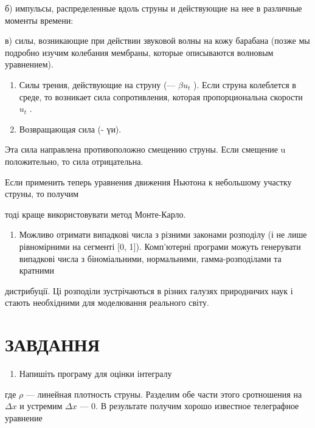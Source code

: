 \documentclass[
  ukrainian,
]{article}
\providecommand{\tightlist}{%
  \setlength{\itemsep}{0pt}\setlength{\parskip}{0pt}}
\begin{document}
б) импульсы, распределенные вдоль струны и действующие на нее в
различные моменты времени:

в) силы, возникающие при действии звуковой волны на кожу барабана (позже
мы подробно изучим колебания мембраны, которые описываются волновым
уравнением).

\begin{enumerate}
\def\labelenumi{\arabic{enumi}.}
\setcounter{enumi}{2}
\item
  Силы трения, действующие на струну (--- \(\beta u_t\) ). Если струна
  колеблется в среде, то возникает сила сопротивления, которая
  пропорциональна скорости \(u_t\) .
\item
  Возвращающая сила (- үи).
\end{enumerate}

Эта сила направлена противоположно смещению струны. Если смещение u
положительно, то сила отрицательна.

Если применить теперь уравнения движения Ньютона к небольшому участку
струны, то получим

тоді краще використовувати метод Монте-Карло.

\begin{enumerate}
\def\labelenumi{\arabic{enumi}.}
\setcounter{enumi}{2}
\tightlist
\item
  Можливо отримати випадкові числа з різними законами розподілу (і не
  лише рівномірними на сегменті {[}0, 1{]}). Комп'ютерні програми можуть
  генерувати випадкові числа з біноміальними, нормальними,
  гамма-розподілами та кратними
\end{enumerate}

дистрибуції. Ці розподіли зустрічаються в різних галузях природничих
наук і стають необхідними для моделювання реального світу.

\section{ЗАВДАННЯ}\label{ux437ux430ux432ux434ux430ux43dux43dux44f-9}

\begin{enumerate}
\def\labelenumi{\arabic{enumi}.}
\tightlist
\item
  Напишіть програму для оцінки інтегралу
\end{enumerate}

где \(\rho\) --- линейная плотность струны. Разделим обе части этого
сротношения на \(\Delta x\) и устремим \(\Delta x\) --- 0. В результате
получим хорошо известное телеграфное уравнение
\end{document}
